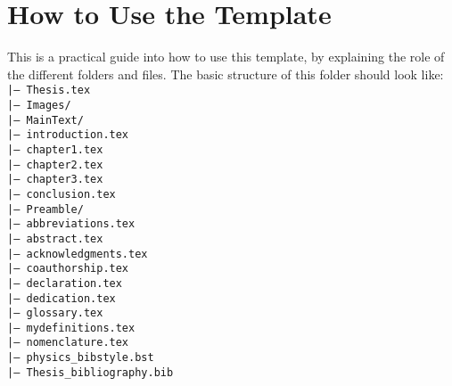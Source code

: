 \chapter{How to Use the Template} \label{ch-2}

This is a practical guide into how to use this template, by explaining the role
of the different folders and files. The basic structure of this folder should
look like:
\texttt{
\\
|--- Thesis.tex \\ 
|--- Images/ \\ 
|--- MainText/ \\ 
\hspace*{0.5cm}|--- introduction.tex\\
\hspace*{0.5cm}|--- chapter1.tex\\
\hspace*{0.5cm}|--- chapter2.tex\\
\hspace*{0.5cm}|--- chapter3.tex\\
\hspace*{0.5cm}|--- conclusion.tex\\
|--- Preamble/ \\ 
\hspace*{0.5cm}|--- abbreviations.tex\\
\hspace*{0.5cm}|--- abstract.tex\\
\hspace*{0.5cm}|--- acknowledgments.tex\\
\hspace*{0.5cm}|--- coauthorship.tex\\
\hspace*{0.5cm}|--- declaration.tex\\
\hspace*{0.5cm}|--- dedication.tex\\
\hspace*{0.5cm}|--- glossary.tex\\
\hspace*{0.5cm}|--- mydefinitions.tex\\
\hspace*{0.5cm}|--- nomenclature.tex\\
\hspace*{0.5cm}|--- physics\_bibstyle.bst\\
\hspace*{0.5cm}|--- Thesis\_bibliography.bib\\
}

